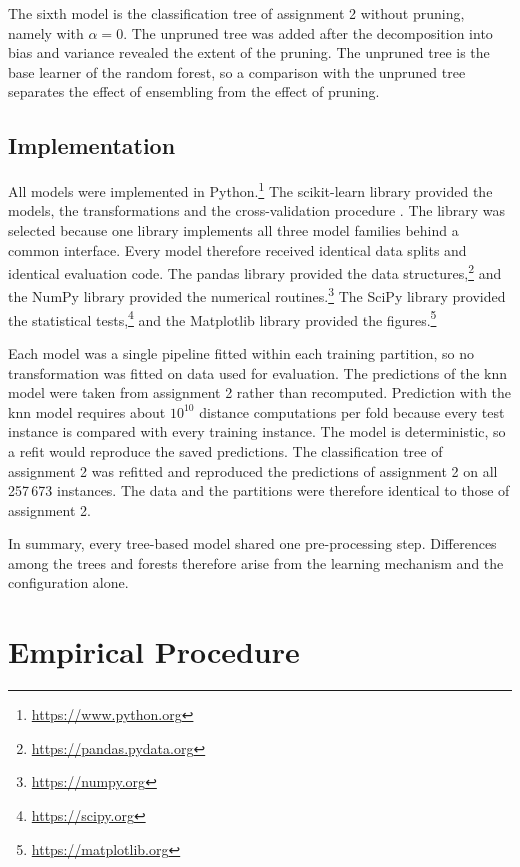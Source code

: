 \documentclass[conference]{IEEEtran}
\begin{document}
The sixth model is the classification tree of assignment 2 without pruning, namely
with $\alpha = 0$. The unpruned tree was added after the decomposition into bias
and variance revealed the extent of the pruning. The
unpruned tree is the base learner of the random forest, so a comparison with the
unpruned tree separates the effect of ensembling from the effect of pruning.

\subsection{Implementation}

All models were implemented in Python.\footnote{\url{https://www.python.org}} The
scikit-learn library provided the models, the transformations and the
cross-validation procedure \cite{pedregosa2011}. The library was selected because
one library implements all three model families behind a common interface. Every
model therefore received identical data splits and identical evaluation code. The
pandas library provided the data
structures,\footnote{\url{https://pandas.pydata.org}} and the NumPy library
provided the numerical routines.\footnote{\url{https://numpy.org}} The SciPy library
provided the statistical tests,\footnote{\url{https://scipy.org}} and the Matplotlib
library provided the figures.\footnote{\url{https://matplotlib.org}}

Each model was a single pipeline fitted within each training partition, so no
transformation was fitted on data used for evaluation. The predictions of the
\gls{knn} model were taken from assignment 2 rather than recomputed. Prediction with
the \gls{knn} model requires about $10^{10}$ distance computations per fold because
every test instance is compared with every training instance. The model is
deterministic, so a refit would reproduce the saved predictions. The classification
tree of assignment 2 was refitted and reproduced the predictions of assignment 2 on
all 257\,673 instances. The data and the partitions were therefore identical to
those of assignment 2.

In summary, every tree-based model shared one pre-processing step. Differences
among the trees and forests therefore arise from the learning mechanism and the
configuration alone.

\section{Empirical Procedure}
\end{document}
